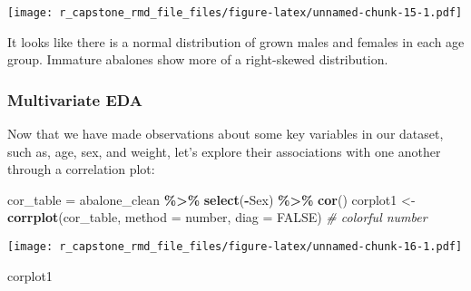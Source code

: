 \documentclass[
]{article}
\newenvironment{Shaded}{\begin{snugshade}}{\end{snugshade}}
\newcommand{\AttributeTok}[1]{\textcolor[rgb]{0.13,0.29,0.53}{#1}}
\newcommand{\CommentTok}[1]{\textcolor[rgb]{0.56,0.35,0.01}{\textit{#1}}}
\newcommand{\ConstantTok}[1]{\textcolor[rgb]{0.56,0.35,0.01}{#1}}
\newcommand{\FunctionTok}[1]{\textcolor[rgb]{0.13,0.29,0.53}{\textbf{#1}}}
\newcommand{\NormalTok}[1]{#1}
\newcommand{\OtherTok}[1]{\textcolor[rgb]{0.56,0.35,0.01}{#1}}
\newcommand{\SpecialCharTok}[1]{\textcolor[rgb]{0.81,0.36,0.00}{\textbf{#1}}}
\newcommand{\StringTok}[1]{\textcolor[rgb]{0.31,0.60,0.02}{#1}}
\begin{document}
\texttt{[image: r\_capstone\_rmd\_file\_files/figure-latex/unnamed-chunk-15-1.pdf]}

It looks like there is a normal distribution of grown males and females
in each age group. Immature abalones show more of a right-skewed
distribution.

\hypertarget{multivariate-eda}{%
\subsubsection{Multivariate EDA}\label{multivariate-eda}}

Now that we have made observations about some key variables in our
dataset, such as, age, sex, and weight, let's explore their associations
with one another through a correlation plot:

\begin{Shaded}
\begin{Highlighting}[]
\NormalTok{cor\_table }\OtherTok{=}\NormalTok{ abalone\_clean }\SpecialCharTok{\%\textgreater{}\%} \FunctionTok{select}\NormalTok{(}\SpecialCharTok{{-}}\NormalTok{Sex) }\SpecialCharTok{\%\textgreater{}\%} \FunctionTok{cor}\NormalTok{()}
\NormalTok{corplot1 }\OtherTok{\textless{}{-}} \FunctionTok{corrplot}\NormalTok{(cor\_table, }\AttributeTok{method =} \StringTok{\textquotesingle{}number\textquotesingle{}}\NormalTok{, }\AttributeTok{diag =} \ConstantTok{FALSE}\NormalTok{) }\CommentTok{\# colorful number}
\end{Highlighting}
\end{Shaded}

\texttt{[image: r\_capstone\_rmd\_file\_files/figure-latex/unnamed-chunk-16-1.pdf]}

\begin{Shaded}
\begin{Highlighting}[]
\NormalTok{corplot1}
\end{Highlighting}
\end{Shaded}
\end{document}
